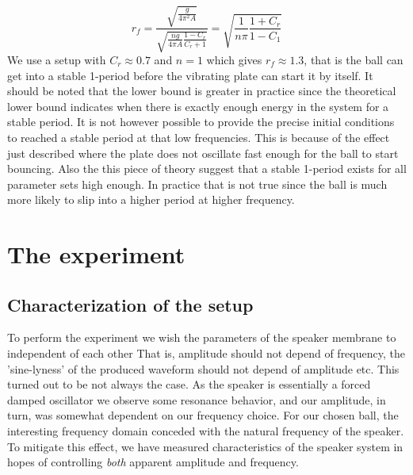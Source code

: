 \documentclass[12pt,oneside,a4paper]{article}
\numberwithin{equation}{section}
\begin{document}
{{{{\begin{equation}
	r_f=\frac{\sqrt{\frac{g}{4\pi^2A}}}{\sqrt{\frac{ng}{4\pi A}\frac{1-C_r}{C_r+1}}} = \sqrt{\frac{1}{n\pi} \frac{1+C_r}{1-C_1}}
\end{equation}
We use a setup with $C_r\approx 0.7$ and $n=1$ which gives $r_f\approx1.3$, that is the ball can get into a stable 1-period before the vibrating plate can start it by itself. It should be noted that the lower bound is greater in practice since the theoretical lower bound indicates when there is exactly enough energy in the system for a stable period. It is not however possible to provide the precise initial conditions to reached a stable period at that low frequencies. This is because of the effect just described where the plate does not oscillate fast enough for the ball to start bouncing. Also the this piece of theory suggest that a stable 1-period exists for all parameter sets high enough. In practice that is not true since the ball is much more likely to slip into a higher period at higher frequency. 

\section{The experiment}
\subsection{Characterization of the setup}
To perform the experiment we wish the parameters of the speaker membrane to independent of each other That is, amplitude should not depend of frequency, the 'sine-lyness' of the produced waveform should not depend of amplitude etc. This turned out to be not always the case. As the speaker is essentially a forced damped oscillator we observe some resonance behavior, and our amplitude, in turn, was somewhat dependent on our frequency choice. For our chosen ball, the interesting frequency domain conceded with the natural frequency of the speaker. To mitigate this effect, we have measured characteristics of the speaker system in hopes of controlling \emph{both} apparent amplitude and frequency.  

}}}}
\end{document}
